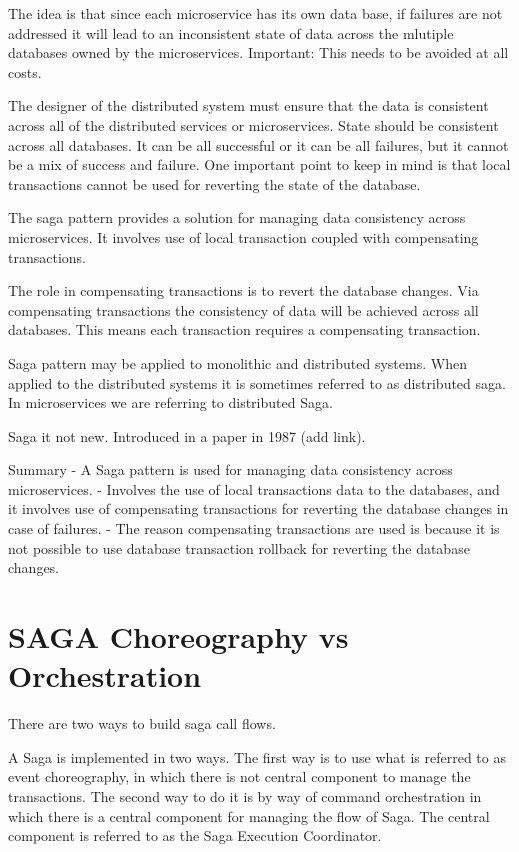 The idea is that since each microservice has its own data base, if failures are not addressed it will lead to an inconsistent state of data across the mlutiple databases owned by the microservices.
Important: This needs to be avoided at all costs.

The designer of the distributed system must ensure that the data is consistent across all of the distributed services or microservices.
State should be consistent across all databases.
It can be all successful or it can be all failures, but it cannot be a mix of success and failure.
One important point to keep in mind is that local transactions cannot be used for reverting the state of the database.

The saga pattern provides a solution for managing data consistency across microservices.
It involves use of local transaction coupled with compensating transactions.

The role in compensating transactions is to revert the database changes.
Via compensating transactions the consistency of data will be achieved across all databases.
This means each transaction requires a compensating transaction.

Saga pattern may be applied to monolithic and distributed systems.
When applied to the distributed systems it is sometimes referred to as distributed saga.
In microservices we are referring to distributed Saga.

Saga it not new. Introduced in a paper in 1987 (add link).

Summary
- A Saga pattern is used for managing data consistency across microservices.
- Involves the use of local transactions data to the databases, and it involves use of compensating transactions for reverting the database changes in case of failures.
- The reason compensating transactions are used is because it is not possible to use database transaction rollback for reverting the database changes.

\section{SAGA Choreography vs Orchestration}

There are two ways to build saga call flows.

A Saga is implemented in two ways.
The first way is to use what is referred to as event choreography, in which there is not central component to manage the transactions.
The second way to do it is by way of command orchestration in which there is a central component for managing the flow of Saga.
The central component is referred to as the Saga Execution Coordinator.

